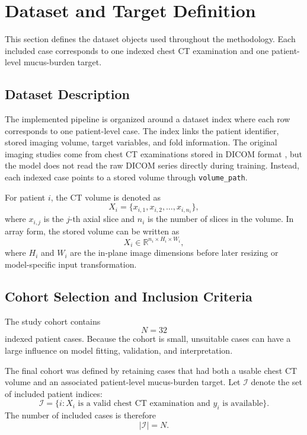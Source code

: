\section{Dataset and Target Definition}
\label{sec:dataset_target_definition}

This section defines the dataset objects used throughout the methodology. Each included case corresponds to one indexed chest CT examination and one patient-level mucus-burden target.


\subsection{Dataset Description}
\label{sec:dataset_description}

The implemented pipeline is organized around a dataset index where each row corresponds to one patient-level case. The index links the patient identifier, stored imaging volume, target variables, and fold information. The original imaging studies come from chest CT examinations stored in DICOM format \cite{dicomstandard2026}, but the model does not read the raw DICOM series directly during training. Instead, each indexed case points to a stored volume through \texttt{volume\_path}.

For patient \(i\), the CT volume is denoted as
\[
X_i = \{x_{i,1}, x_{i,2}, \dots, x_{i,n_i}\},
\]
where \(x_{i,j}\) is the \(j\)-th axial slice and \(n_i\) is the number of slices in the volume. In array form, the stored volume can be written as
\[
X_i \in \mathbb{R}^{n_i \times H_i \times W_i},
\]
where \(H_i\) and \(W_i\) are the in-plane image dimensions before later resizing or model-specific input transformation.


\subsection{Cohort Selection and Inclusion Criteria}
\label{sec:cohort_selection_inclusion_criteria}

The study cohort contains
\[
N = 32
\]
indexed patient cases. Because the cohort is small, unsuitable cases can have a large influence on model fitting, validation, and interpretation.

The final cohort was defined by retaining cases that had both a usable chest CT volume and an associated patient-level mucus-burden target. Let \(\mathcal{I}\) denote the set of included patient indices:
\[
\mathcal{I}
=
\{i : X_i \text{ is a valid chest CT examination and } y_i \text{ is available}\}.
\]
The number of included cases is therefore
\[
|\mathcal{I}| = N.
\]

